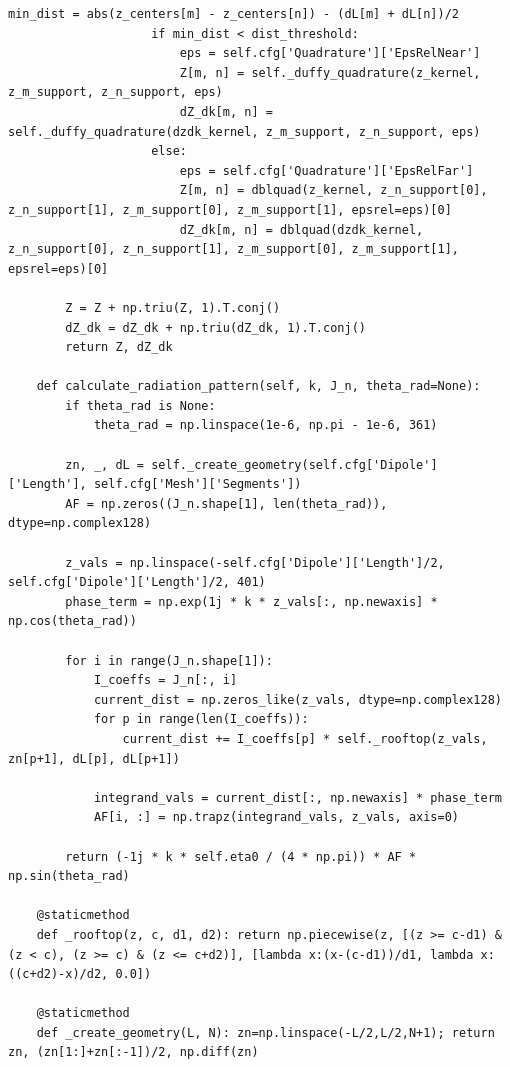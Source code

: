 \documentclass[11pt, a4paper]{report}
\begin{document}
\begin{lstlisting}[caption={The core MoM/CMA solver in Python.}, label={lst:main_cma}]
                    min_dist = abs(z_centers[m] - z_centers[n]) - (dL[m] + dL[n])/2
                    if min_dist < dist_threshold:
                        eps = self.cfg['Quadrature']['EpsRelNear']
                        Z[m, n] = self._duffy_quadrature(z_kernel, z_m_support, z_n_support, eps)
                        dZ_dk[m, n] = self._duffy_quadrature(dzdk_kernel, z_m_support, z_n_support, eps)
                    else:
                        eps = self.cfg['Quadrature']['EpsRelFar']
                        Z[m, n] = dblquad(z_kernel, z_n_support[0], z_n_support[1], z_m_support[0], z_m_support[1], epsrel=eps)[0]
                        dZ_dk[m, n] = dblquad(dzdk_kernel, z_n_support[0], z_n_support[1], z_m_support[0], z_m_support[1], epsrel=eps)[0]
        
        Z = Z + np.triu(Z, 1).T.conj()
        dZ_dk = dZ_dk + np.triu(dZ_dk, 1).T.conj()
        return Z, dZ_dk
    
    def calculate_radiation_pattern(self, k, J_n, theta_rad=None):
        if theta_rad is None:
            theta_rad = np.linspace(1e-6, np.pi - 1e-6, 361)
            
        zn, _, dL = self._create_geometry(self.cfg['Dipole']['Length'], self.cfg['Mesh']['Segments'])
        AF = np.zeros((J_n.shape[1], len(theta_rad)), dtype=np.complex128)
        
        z_vals = np.linspace(-self.cfg['Dipole']['Length']/2, self.cfg['Dipole']['Length']/2, 401)
        phase_term = np.exp(1j * k * z_vals[:, np.newaxis] * np.cos(theta_rad))
        
        for i in range(J_n.shape[1]):
            I_coeffs = J_n[:, i]
            current_dist = np.zeros_like(z_vals, dtype=np.complex128)
            for p in range(len(I_coeffs)):
                current_dist += I_coeffs[p] * self._rooftop(z_vals, zn[p+1], dL[p], dL[p+1])
            
            integrand_vals = current_dist[:, np.newaxis] * phase_term
            AF[i, :] = np.trapz(integrand_vals, z_vals, axis=0)
            
        return (-1j * k * self.eta0 / (4 * np.pi)) * AF * np.sin(theta_rad)

    @staticmethod
    def _rooftop(z, c, d1, d2): return np.piecewise(z, [(z >= c-d1) & (z < c), (z >= c) & (z <= c+d2)], [lambda x:(x-(c-d1))/d1, lambda x:((c+d2)-x)/d2, 0.0])
    
    @staticmethod
    def _create_geometry(L, N): zn=np.linspace(-L/2,L/2,N+1); return zn, (zn[1:]+zn[:-1])/2, np.diff(zn)


\end{lstlisting}
\end{document}
